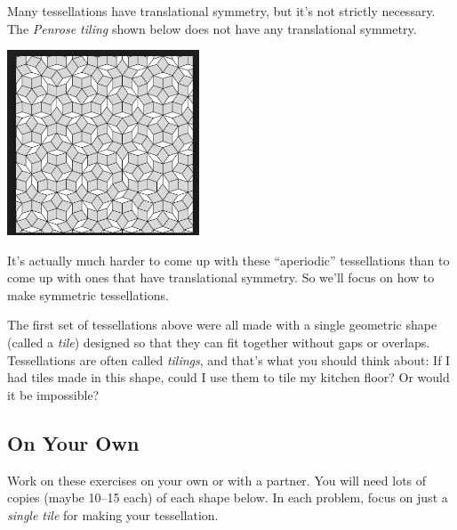 Many tessellations have translational symmetry, but it's not strictly necessary.  The \emph{Penrose tiling} shown below does not have any translational symmetry.  

\begin{center}
\includegraphics[height=5.5cm]{tessellate8}
\end{center}


It's actually much harder to come up with these ``aperiodic'' tessellations than to come up with ones that have translational symmetry.  So we'll focus on how to make symmetric tessellations.

The first set of tessellations above were all made with a single geometric shape (called a \emph{tile}) designed so that they can fit together without gaps or overlaps.  Tessellations are often called \emph{tilings}, and that's what you should think about: If I had tiles made in this shape, could I use them to tile my kitchen floor?  Or would it be impossible?

\subsection*{On Your Own}
Work on these exercises on your own or with a partner.  You will need lots of copies (maybe 10--15 each) of each shape below.
In each problem, focus on just a \emph{single tile} for making your tessellation.

